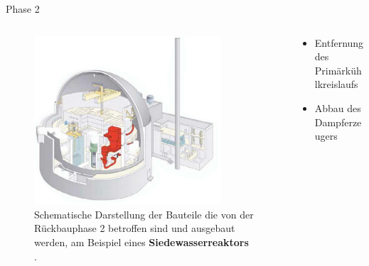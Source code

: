 \begin{frame}{Phase 2}
  \begin{columns}

    \begin{column}{0.48\textwidth}
      \begin{figure}
         \centering
         \includegraphics[width=0.85\textwidth]{./bilder/abbau_schritt_2.PNG}
         \caption{ Schematische Darstellung der Bauteile die von der Rückbauphase 2 betroffen sind und ausgebaut werden, am Beispiel eines \textbf{Siedewasserreaktors} \cite{stilllegung_grs}. }
         \label{ fig: phase_2 }
       \end{figure}
     \end{column}

     \begin{column}{0.48\textwidth}
       \begin{itemize}
         \setlength\itemsep{1.2em}
         \item{ Entfernung des Primärkühlkreislaufs }
         \item{ Abbau des Dampferzeugers}
       \end{itemize}
     \end{column}

  \end{columns}
\end{frame}



